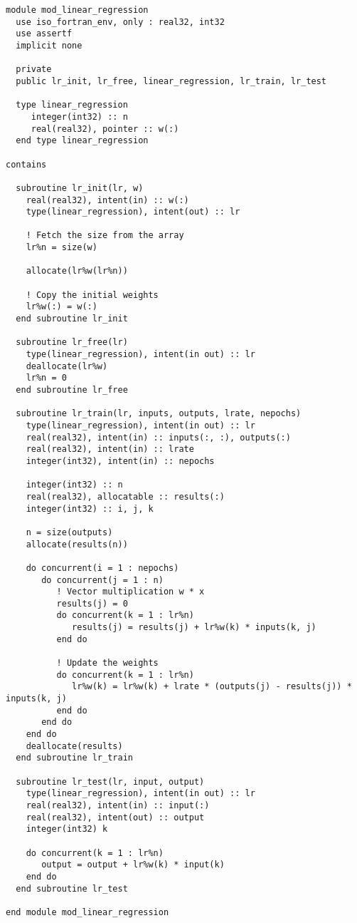 \begin{lstlisting}
module mod_linear_regression
  use iso_fortran_env, only : real32, int32
  use assertf
  implicit none

  private
  public lr_init, lr_free, linear_regression, lr_train, lr_test

  type linear_regression
     integer(int32) :: n
     real(real32), pointer :: w(:)
  end type linear_regression
  
contains
  
  subroutine lr_init(lr, w)
    real(real32), intent(in) :: w(:)
    type(linear_regression), intent(out) :: lr

    ! Fetch the size from the array
    lr%n = size(w)

    allocate(lr%w(lr%n))
    
    ! Copy the initial weights 
    lr%w(:) = w(:)
  end subroutine lr_init

  subroutine lr_free(lr)
    type(linear_regression), intent(in out) :: lr
    deallocate(lr%w)
    lr%n = 0
  end subroutine lr_free

  subroutine lr_train(lr, inputs, outputs, lrate, nepochs)
    type(linear_regression), intent(in out) :: lr
    real(real32), intent(in) :: inputs(:, :), outputs(:)
    real(real32), intent(in) :: lrate
    integer(int32), intent(in) :: nepochs

    integer(int32) :: n
    real(real32), allocatable :: results(:)
    integer(int32) :: i, j, k
    
    n = size(outputs)
    allocate(results(n))

    do concurrent(i = 1 : nepochs)
       do concurrent(j = 1 : n)
          ! Vector multiplication w * x
          results(j) = 0
          do concurrent(k = 1 : lr%n)
             results(j) = results(j) + lr%w(k) * inputs(k, j)
          end do

          ! Update the weights
          do concurrent(k = 1 : lr%n)
             lr%w(k) = lr%w(k) + lrate * (outputs(j) - results(j)) * inputs(k, j)
          end do
       end do
    end do
    deallocate(results)
  end subroutine lr_train

  subroutine lr_test(lr, input, output)
    type(linear_regression), intent(in out) :: lr
    real(real32), intent(in) :: input(:)
    real(real32), intent(out) :: output
    integer(int32) k

    do concurrent(k = 1 : lr%n)
       output = output + lr%w(k) * input(k)
    end do
  end subroutine lr_test
  
end module mod_linear_regression
\end{lstlisting}

